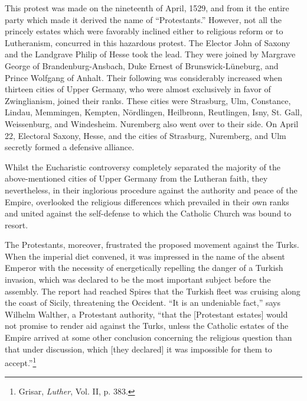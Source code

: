This protest was made on the nineteenth of April, 1529, and from
it the entire party which made it derived the name of “Protestants.”
However, not all the princely estates which were favorably inclined
either to religious reform or to Lutheranism, concurred in this
hazardous protest. The Elector John of Saxony and the Landgrave
Philip of Hesse took the lead. They were joined by Margrave George
of Brandenburg-Ansbach, Duke Ernest of Brunswick-Lüneburg,
and Prince Wolfgang of Anhalt. Their following was considerably
increased when thirteen cities of Upper Germany, who were almost
exclusively in favor of Zwinglianism, joined their ranks. These cities
were Strasburg, Ulm, Constance, Lindau, Memmingen, Kempten,
Nördlingen, Heilbronn, Reutlingen, Isny, St. Gall, Weissenburg, and
Windesheim. Nuremberg also went over to their side. On April 22,
Electoral Saxony, Hesse, and the cities of Strasburg, Nuremberg, and
Ulm secretly formed a defensive alliance.

Whilst the Eucharistic controversy completely separated the
majority of the above-mentioned cities of Upper Germany from
the Lutheran faith, they nevertheless, in their inglorious procedure
against the authority and peace of the Empire, overlooked the religious
differences which prevailed in their own ranks and united against the
self-defense to which the Catholic Church was bound to resort.

The Protestants, moreover, frustrated the proposed movement
against the Turks. When the imperial diet convened, it was impressed in
the name of the absent Emperor with the necessity of
energetically repelling the danger of a Turkish invasion, which was
declared to be the most important subject before the assembly. The report
had reached Spires that the Turkish fleet was cruising along the
coast of Sicily, threatening the Occident. “It is an undeniable fact,”
says Wilhelm Walther, a Protestant authority, “that the [Protestant
estates] would not promise to render aid against the Turks, unless the
Catholic estates of the Empire arrived at some other conclusion concerning
the religious question than that under discussion, which [they
declared] it was impossible for them to accept.”\footnote{Grisar, \textit{Luther}, Vol. II, p. 383.}


